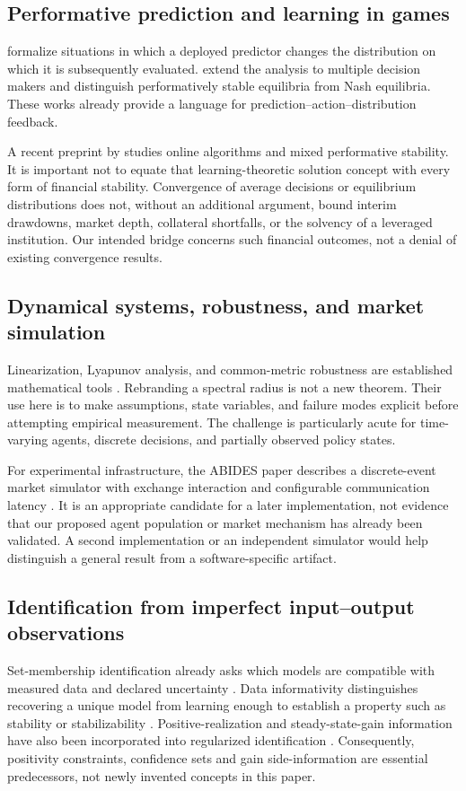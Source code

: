 \documentclass[11pt,a4paper]{article}
\theoremstyle{definition}
\theoremstyle{remark}
\begin{document}
\subsection{Performative prediction and learning in games}
\citet{perdomo2020} formalize situations in which a deployed predictor changes the distribution on which it is subsequently evaluated. \citet{narang2023} extend the analysis to multiple decision makers and distinguish performatively stable equilibria from Nash equilibria. These works already provide a language for prediction--action--distribution feedback.

A recent preprint by \citet{farina2026} studies online algorithms and mixed performative stability. It is important not to equate that learning-theoretic solution concept with every form of financial stability. Convergence of average decisions or equilibrium distributions does not, without an additional argument, bound interim drawdowns, market depth, collateral shortfalls, or the solvency of a leveraged institution. Our intended bridge concerns such financial outcomes, not a denial of existing convergence results.

\subsection{Dynamical systems, robustness, and market simulation}
Linearization, Lyapunov analysis, and common-metric robustness are established mathematical tools \citep{khalil2002,boyd1994}. Rebranding a spectral radius is not a new theorem. Their use here is to make assumptions, state variables, and failure modes explicit before attempting empirical measurement. The challenge is particularly acute for time-varying agents, discrete decisions, and partially observed policy states.

For experimental infrastructure, the ABIDES paper describes a discrete-event market simulator with exchange interaction and configurable communication latency \citep{byrd2019}. It is an appropriate candidate for a later implementation, not evidence that our proposed agent population or market mechanism has already been validated. A second implementation or an independent simulator would help distinguish a general result from a software-specific artifact.

\subsection{Identification from imperfect input--output observations}
Set-membership identification already asks which models are compatible with measured data and declared uncertainty \citep{kosut1992}. Data informativity distinguishes recovering a unique model from learning enough to establish a property such as stability or stabilizability \citep{vanwaarde2020}. Positive-realization and steady-state-gain information have also been incorporated into regularized identification \citep{khosravi2025,khosravi2022}. Consequently, positivity constraints, confidence sets and gain side-information are essential predecessors, not newly invented concepts in this paper.
\end{document}
